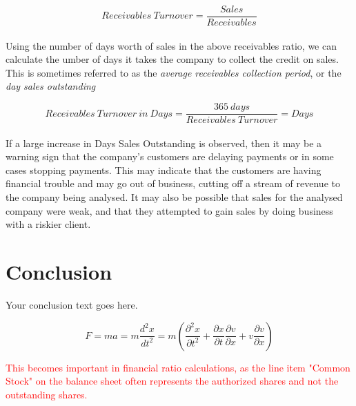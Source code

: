 \documentclass{article}
\begin{document}
\begin{equation}
    Receivables\: Turnover= \frac{Sales}{Receivables} 
\end{equation}\\

Using the number of days worth of sales in the above receivables ratio, we can calculate the umber of days it takes the company to collect the credit on sales. This is sometimes referred to as the \textit{average receivables collection period}, or the \textit{day sales outstanding}

\begin{equation}
    Receivables\: Turnover\: in\: Days = \frac{365\: days}{Receivables\: Turnover} = Days
\end{equation}\\


If a large increase in Days Sales Outstanding is observed, then it may be a warning sign that the company's customers are delaying payments or in some cases stopping payments. This may indicate that the customers are having financial trouble and may go out of business, cutting off a stream of revenue to the company being analysed. It may also be possible that sales for the analysed company were weak, and that they attempted to gain sales by doing business with a riskier client. 

















\section{Conclusion}

Your conclusion text goes here.


\begin{equation}
    F = ma = m\frac{d^2x}{dt^2} = m\left(\frac{\partial^2x}{\partial t^2} + \frac{\partial x}{\partial t}\frac{\partial v}{\partial x} + v\frac{\partial v}{\partial x}\right)
\end{equation}

\textcolor{red}{This becomes important in financial ratio calculations, as the line item "Common Stock" on the balance sheet often represents the authorized shares and not the outstanding shares.}
\end{document}
